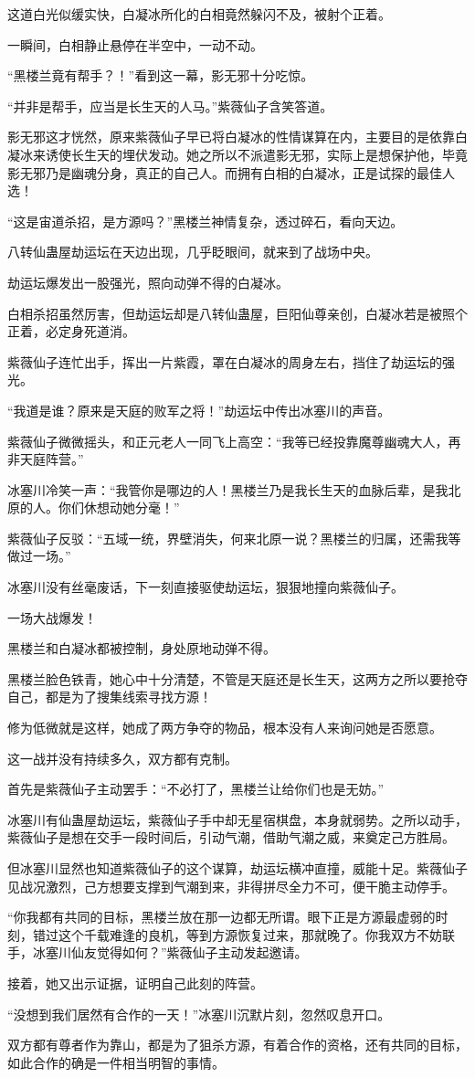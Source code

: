 \begin{this_body}
这道白光似缓实快，白凝冰所化的白相竟然躲闪不及，被射个正着。

一瞬间，白相静止悬停在半空中，一动不动。

“黑楼兰竟有帮手？！”看到这一幕，影无邪十分吃惊。

“并非是帮手，应当是长生天的人马。”紫薇仙子含笑答道。

影无邪这才恍然，原来紫薇仙子早已将白凝冰的性情谋算在内，主要目的是依靠白凝冰来诱使长生天的埋伏发动。她之所以不派遣影无邪，实际上是想保护他，毕竟影无邪乃是幽魂分身，真正的自己人。而拥有白相的白凝冰，正是试探的最佳人选！

“这是宙道杀招，是方源吗？”黑楼兰神情复杂，透过碎石，看向天边。

八转仙蛊屋劫运坛在天边出现，几乎眨眼间，就来到了战场中央。

劫运坛爆发出一股强光，照向动弹不得的白凝冰。

白相杀招虽然厉害，但劫运坛却是八转仙蛊屋，巨阳仙尊亲创，白凝冰若是被照个正着，必定身死道消。

紫薇仙子连忙出手，挥出一片紫霞，罩在白凝冰的周身左右，挡住了劫运坛的强光。

“我道是谁？原来是天庭的败军之将！”劫运坛中传出冰塞川的声音。

紫薇仙子微微摇头，和正元老人一同飞上高空：“我等已经投靠魔尊幽魂大人，再非天庭阵营。”

冰塞川冷笑一声：“我管你是哪边的人！黑楼兰乃是我长生天的血脉后辈，是我北原的人。你们休想动她分毫！”

紫薇仙子反驳：“五域一统，界壁消失，何来北原一说？黑楼兰的归属，还需我等做过一场。”

冰塞川没有丝毫废话，下一刻直接驱使劫运坛，狠狠地撞向紫薇仙子。

一场大战爆发！

黑楼兰和白凝冰都被控制，身处原地动弹不得。

黑楼兰脸色铁青，她心中十分清楚，不管是天庭还是长生天，这两方之所以要抢夺自己，都是为了搜集线索寻找方源！

修为低微就是这样，她成了两方争夺的物品，根本没有人来询问她是否愿意。

这一战并没有持续多久，双方都有克制。

首先是紫薇仙子主动罢手：“不必打了，黑楼兰让给你们也是无妨。”

冰塞川有仙蛊屋劫运坛，紫薇仙子手中却无星宿棋盘，本身就弱势。之所以动手，紫薇仙子是想在交手一段时间后，引动气潮，借助气潮之威，来奠定己方胜局。

但冰塞川显然也知道紫薇仙子的这个谋算，劫运坛横冲直撞，威能十足。紫薇仙子见战况激烈，己方想要支撑到气潮到来，非得拼尽全力不可，便干脆主动停手。

“你我都有共同的目标，黑楼兰放在那一边都无所谓。眼下正是方源最虚弱的时刻，错过这个千载难逢的良机，等到方源恢复过来，那就晚了。你我双方不妨联手，冰塞川仙友觉得如何？”紫薇仙子主动发起邀请。

接着，她又出示证据，证明自己此刻的阵营。

“没想到我们居然有合作的一天！”冰塞川沉默片刻，忽然叹息开口。

双方都有尊者作为靠山，都是为了狙杀方源，有着合作的资格，还有共同的目标，如此合作的确是一件相当明智的事情。

\end{this_body}

